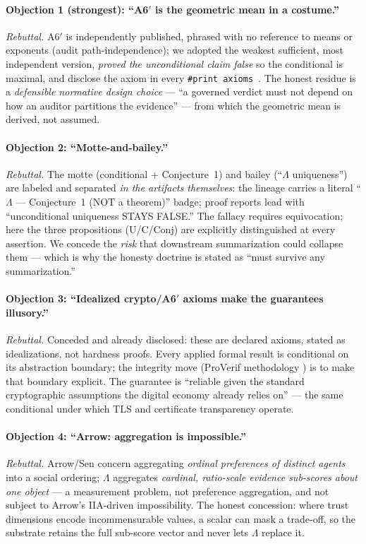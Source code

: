 \documentclass[11pt]{article}
\theoremstyle{plain}
\theoremstyle{definition}
\theoremstyle{remark}
\newcommand{\La}{\Lambda}
\newcommand{\printax}[1]{\texttt{\#print axioms}~\texttt{#1}}
\begin{document}
\paragraph{Objection 1 (strongest): ``A6$'$ is the geometric mean in a costume.''}
\emph{Rebuttal.} A6$'$ is independently published, phrased with no reference to means
or exponents (audit path-independence); we adopted the weakest sufficient, most
independent version, \emph{proved the unconditional claim false} so the conditional
is maximal, and disclose the axiom in every \printax{}. The honest residue is a
\emph{defensible normative design choice} --- ``a governed verdict must not depend on
how an auditor partitions the evidence'' --- from which the geometric mean is derived,
not assumed.

\paragraph{Objection 2: ``Motte-and-bailey.''}
\emph{Rebuttal.} The motte (conditional + Conjecture~1) and bailey (``$\La$ uniqueness'')
are labeled and separated \emph{in the artifacts themselves}: the lineage carries a
literal ``$\La$ --- Conjecture~1 (NOT a theorem)'' badge; proof reports lead with
``unconditional uniqueness STAYS FALSE.'' The fallacy requires equivocation; here the
three propositions (U/C/Conj) are explicitly distinguished at every assertion. We
concede the \emph{risk} that downstream summarization could collapse them --- which is
why the honesty doctrine is stated as ``must survive any summarization.''

\paragraph{Objection 3: ``Idealized crypto/A6$'$ axioms make the guarantees illusory.''}
\emph{Rebuttal.} Conceded and already disclosed: these are declared axioms, stated as
idealizations, not hardness proofs. Every applied formal result is conditional on its
abstraction boundary; the integrity move (ProVerif methodology \cite{proverif}) is to
make that boundary explicit. The guarantee is ``reliable given the standard
cryptographic assumptions the digital economy already relies on'' --- the same
conditional under which TLS and certificate transparency operate.

\paragraph{Objection 4: ``Arrow: aggregation is impossible.''}
\emph{Rebuttal.} Arrow/Sen concern aggregating \emph{ordinal preferences of distinct
agents} into a social ordering; $\La$ aggregates \emph{cardinal, ratio-scale evidence
sub-scores about one object} --- a measurement problem, not preference aggregation,
and not subject to Arrow's IIA-driven impossibility. The honest concession: where
trust dimensions encode incommensurable values, a scalar can mask a trade-off, so the
substrate retains the full sub-score vector and never lets $\La$ replace it.
\end{document}
